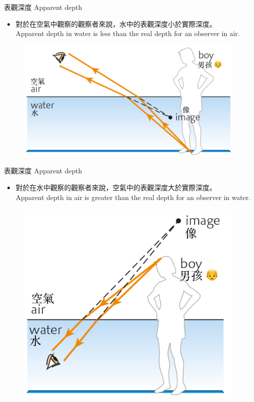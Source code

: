 \documentclass[beamer=true]{standalone}
\begin{document}
\begin{frame}{表觀深度 Apparent depth}
\begin{itemize}
    \item 對於在空氣中觀察的觀察者來說，水中的表觀深度小於實際深度。\\Apparent depth in water is less than the real depth for an observer in air.
\end{itemize}
    \begin{figure}
        \centering
        \includegraphics[width=0.75\linewidth]{assets/98398379879728dd.png}
        
        
    \end{figure}
\end{frame}

\begin{frame}{表觀深度 Apparent depth}
    \begin{itemize}
        \item 對於在水中觀察的觀察者來說，空氣中的表觀深度大於實際深度。\\Apparent depth in air is greater than the real depth for an observer in water.
    \end{itemize}
    \begin{figure}
        \centering
        \includegraphics[width=0.5\linewidth]{assets/d9832u.png}
    \end{figure}
    
\end{frame}
\end{document}
